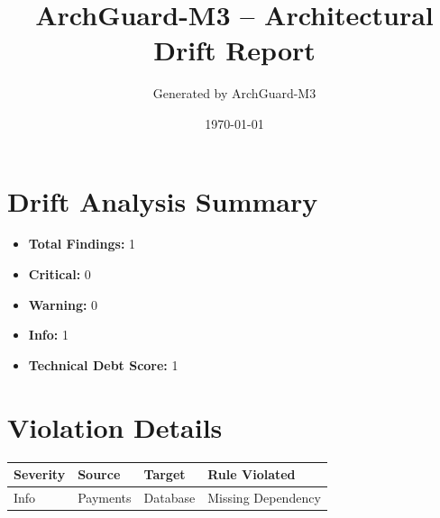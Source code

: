 \documentclass{article}
\title{ArchGuard-M3 -- Architectural Drift Report}
\author{Generated by ArchGuard-M3}
\date{\today}
\begin{document}
\maketitle

\section{Drift Analysis Summary}
\begin{itemize}
  \item \textbf{Total Findings:} 1
  \item \textbf{Critical:} 0
  \item \textbf{Warning:} 0
  \item \textbf{Info:} 1
  \item \textbf{Technical Debt Score:} 1
\end{itemize}

\section{Violation Details}
\begin{longtable}{|l|l|l|p{5cm}|}
\hline
\textbf{Severity} & \textbf{Source} & \textbf{Target} & \textbf{Rule Violated} \\
\hline\hline
Info & Payments & Database & Missing Dependency \\
\hline
\end{longtable}
\end{document}

